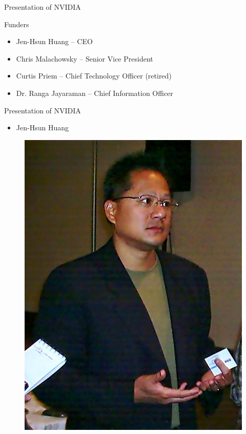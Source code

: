 \documentclass{beamer}
\begin{document}
\begin{frame}{Presentation of NVIDIA}
	\begin{block}{Funders}
		\begin{itemize}
			\item<+->{Jen-Hsun Huang -- CEO}
			\item<+->{Chris Malachowsky -- Senior Vice President}
			\item<+->{Curtis Priem -- Chief Technology Officer (retired)}
			\item<+->{Dr. Ranga Jayaraman -- Chief Information Officer}
		\end{itemize}
	\end{block}

\end{frame}

\begin{frame}{Presentation of NVIDIA}
	\transdissolve[duration=0.08]
	\begin{block}{}
		\begin{itemize}
			\item<+->{Jen-Hsun Huang}
		\end{itemize}
	\end{block}
	\begin{figure}[h]
		\includegraphics[width=0.50\textheight]{images/JensenHuang.jpg}
	\end{figure}
\end{frame}
\end{document}

